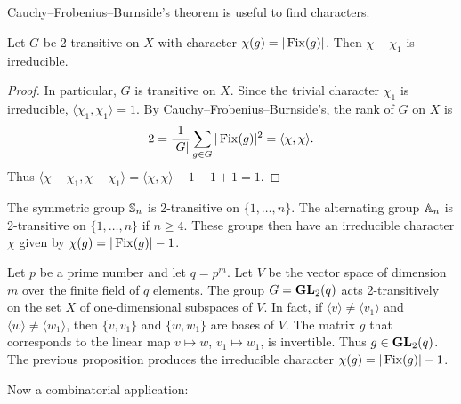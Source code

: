 \chapter{}

Cauchy--Frobenius--Burnside's theorem is useful to
find characters. 

\begin{proposition}
    Let $G$ be 2-transitive on $X$ with character $\chi(g)=|\operatorname{Fix}(g)|$.
    Then $\chi-\chi_1$ is irreducible. 
\end{proposition}

\begin{proof}
    In particular, $G$ is transitive on $X$. 
    Since the trivial character $\chi_1$ is irreducible, $\langle\chi_1,\chi_1\rangle=1$. 
    By Cauchy--Frobenius--Burnside's, the rank of $G$ on $X$ is  
    \begin{gather*}
        2=\frac{1}{|G|}\sum_{g\in G}|\operatorname{Fix}(g)|^2=\langle \chi,\chi\rangle.
   \end{gather*}
   Thus $\langle \chi-\chi_1,\chi-\chi_1\rangle=\langle\chi,\chi\rangle-1-1+1=1$.
\end{proof}

\begin{example}
    The symmetric group $\mathbb{S}_n$ is 2-transitive on $\{1,\dots,n\}$. The
    alternating group $\mathbb{A}_n$ is 2-transitive on $\{1,\dots,n\}$ if 
    $n\geq4$. These groups then have an irreducible character $\chi$ 
    given by $\chi(g)=|\operatorname{Fix}(g)|-1$.
\end{example}

\begin{example}
    Let $p$ be a prime number and let $q=p^{m}$. Let $V$ 
    be the vector space of dimension $m$ 
    over the finite field of $q$ elements. 
    The group $G=\mathbf{GL}_2(q)$ acts 2-transitively on the set $X$ of
    one-dimensional subspaces of $V$. In fact, 
    if $\langle v\rangle\ne\langle v_1\rangle$ and $\langle w\rangle\ne\langle w_1\rangle$, 
    then $\{v,v_1\}$ and $\{w,w_1\}$ are bases of $V$. 
    The matrix $g$ that corresponds to the linear map 
    $v\mapsto w$, $v_1\mapsto w_1$, is invertible. Thus $g\in\mathbf{GL}_2(q)$. 
    The previous proposition produces the irreducible character
    $\chi(g)=|\operatorname{Fix}(g)|-1$. 
\end{example}

Now a combinatorial application:

